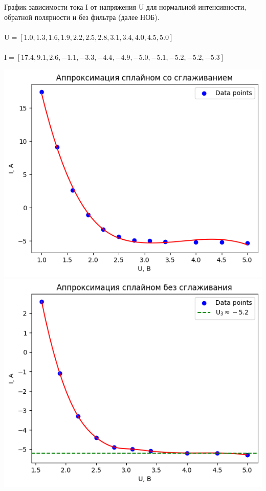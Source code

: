 \documentclass[12pt,openany]{book}
\begin{document}
\newpage

\noindent График зависимости тока I от напряжения U для нормальной интенсивности, 
обратной полярности и без фильтра (далее НОБ).\\\\
$\text{U} = [1.0, 1.3, 1.6, 1.9, 2.2, 2.5, 2.8, 3.1, 3.4, 4.0, 4.5, 5.0]$\\\\
$\text{I} = [17.4, 9.1, 2.6, -1.1, -3.3, -4.4, -4.9, -5.0, -5.1, -5.2, -5.2, -5.3]$\\

\begin{center}
    \includegraphics[scale=0.59]{K4-NRW1} \\

    \includegraphics[scale=0.59]{K4-NRW2} \\
\end{center}
\end{document}
